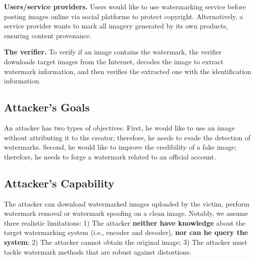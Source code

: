 
\textbf{Users/service providers.} Users would like to use watermarking service before posting images online via social platforms to protect copyright. Alternatively, a service provider wants to mark all imagery generated by its own products, ensuring content provenance.

\textbf{The verifier.} To verify if an image contains the watermark, the verifier downloads target images from the Internet, decodes the image to extract watermark information, and then verifies the extracted one with the identification information. 

\subsection{Attacker's Goals} An attacker has two types of objectives. First, he would like to use an image without attributing it to the creator; therefore, he needs to evade the detection of watermarks. Second, he would like to improve the credibility of a fake image; therefore, he needs to 
forge a watermark related to an official account.

\subsection{Attacker's Capability} The attacker can download watermarked images uploaded by the victim, perform watermark removal or watermark spoofing on a clean image. Notably, we assume three realistic limitations: 1) The attacker \textbf{neither have knowledge} about the target watermarking system (i.e., encoder and decoder), \textbf{nor can he query the system}; 2) The attacker cannot obtain the original image; 3) The attacker must tackle watermark methods that are robust against distortions.




